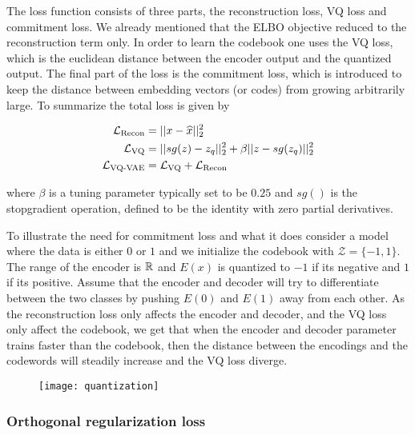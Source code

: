 \documentclass[../../thesis.tex]{subfiles}
\begin{document}
The loss function consists of three parts, the reconstruction loss, VQ loss and commitment loss. We already mentioned that the ELBO objective reduced to the reconstruction term only. In order to learn the codebook one uses the VQ loss, which is the euclidean distance between the encoder output and the quantized output. The final part of the loss is the commitment loss, which is introduced to keep the distance between embedding vectors (or codes) from growing arbitrarily large. To summarize the total loss is given by

    \begin{equation}        
        \begin{aligned}
            \mathcal{L}_{\text{Recon}} &= ||x - \widehat{x}||_2^2\\
            \mathcal{L}_{\text{VQ}} &= ||sg(z) - z_q||_2^2 +\beta||z - sg(z_q)||_2^2\\
            \mathcal{L}_{\text{VQ-VAE}} &= \mathcal{L}_{\text{VQ}} + \mathcal{L}_{\text{Recon}}
        \end{aligned}
    \end{equation}

where $\beta$ is a tuning parameter typically set to be $0.25$ and $sg()$ is the stopgradient operation, defined to be the identity with zero partial derivatives. \newline

To illustrate the need for commitment loss and what it does consider a model where the data is either $0$ or $1$ and we initialize the codebook with $\mathcal{Z} = \{-1,1\}$.  The range of the encoder is $\mathbb{R}$ and $E(x)$ is quantized to $-1$ if its negative and $1$ if its positive. Assume that the encoder and decoder will try to differentiate between the two classes by pushing $E(0)$ and $E(1)$ away from each other. As the reconstruction loss only affects the encoder and decoder, and the VQ loss only affect the codebook, we get that when the encoder and decoder parameter trains faster than the codebook, then the distance between the encodings and the codewords will steadily increase and the VQ loss diverge. \newline 

\begin{figure}[h]
    \texttt{[image: quantization]}
    \centering    
\end{figure}

\subsubsection{Orthogonal regularization loss}
\end{document}
